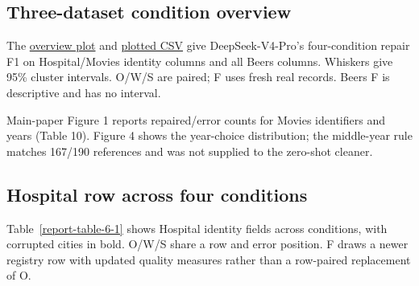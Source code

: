 \documentclass[10pt,a4paper]{article}
\begin{document}
\subsection{Three-dataset condition overview}

The \href{https://github.com/hinsonver/CoRe-Benchmark/blob/main/paper/latex/figures/fig1_decomposition.pdf}{overview plot} and \href{https://github.com/hinsonver/CoRe-Benchmark/blob/main/results/figures/fig1_decomposition.csv}{plotted CSV} give DeepSeek-V4-Pro's four-condition repair F1 on Hospital/Movies identity columns and all Beers columns. Whiskers give 95\% cluster intervals. O/W/S are paired; F uses fresh real records. Beers F is descriptive and has no interval.

Main-paper Figure 1 reports repaired/error counts for Movies identifiers and years (Table 10).
Figure 4 shows the year-choice distribution; the middle-year rule matches 167/190 references
and was not supplied to the zero-shot cleaner.

\subsection{Hospital row across four conditions}

Table~\ref{report-table-6-1} shows Hospital identity fields across conditions, with corrupted cities in bold. O/W/S share a row and error position. F draws a newer registry row with updated quality measures rather than a row-paired replacement of O.
\end{document}
